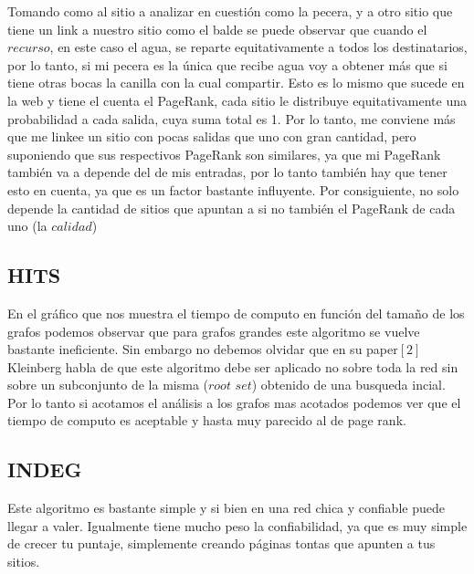 \FloatBarrier

Tomando como al sitio a analizar en cuestión como la pecera, y a otro sitio que tiene un link a nuestro sitio como el balde se puede observar que cuando el $\textit{recurso}$, en este caso el agua, se reparte equitativamente a todos los destinatarios, por lo tanto, si mi pecera es la única que recibe agua voy a obtener más que si tiene otras bocas la canilla con la cual compartir. Esto es lo mismo que sucede en la web y tiene el cuenta el PageRank, cada sitio le distribuye equitativamente una probabilidad a cada salida, cuya suma total es 1. Por lo tanto, me conviene más que me linkee un sitio con pocas salidas que uno con gran cantidad, pero suponiendo que sus respectivos PageRank son similares, ya que mi PageRank también va a depende del de mis entradas, por lo tanto también hay que tener esto en cuenta, ya que es un factor bastante influyente. Por consiguiente, no solo depende la cantidad de sitios que apuntan a si no también el PageRank de cada uno (la  $\textit{calidad}$)

\newpage


\subsection{HITS}

En el gráfico que nos muestra el tiempo de computo en función del tamaño de los grafos podemos observar que para grafos grandes este algoritmo se vuelve bastante ineficiente. Sin embargo no debemos olvidar que en su paper$[2]$ Kleinberg habla de que este algoritmo debe ser aplicado no sobre toda la red sin sobre un subconjunto de la misma ($\textit{root set}$) obtenido de una busqueda incial. Por lo tanto si acotamos el análisis a los grafos mas acotados podemos ver que el tiempo de computo es aceptable y hasta muy parecido al de page rank. 

\subsection{INDEG}

Este algoritmo es bastante simple y si bien en una red chica y confiable puede llegar a valer. Igualmente tiene mucho peso la confiabilidad, ya que es muy simple de crecer tu puntaje, simplemente creando páginas tontas que apunten a tus sitios. 